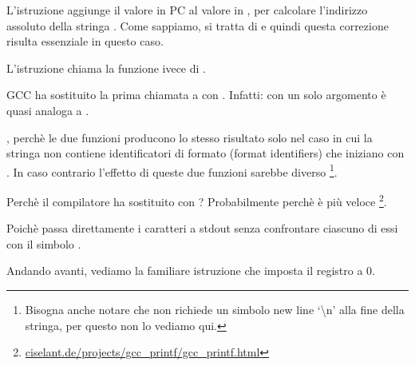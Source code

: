 L'istruzione  aggiunge il valore in \ac{PC} al valore in , per calcolare l'indirizzo assoluto della stringa .
Come sappiamo, si tratta di \q{\PICcode} e quindi questa correzione risulta essenziale in questo caso.

L'istruzione  chiama la funzione \puts ivece di \printf.

\label{puts}

GCC ha sostituito la prima chiamata a \printf con \puts.
Infatti: \printf con un solo argomento è quasi analoga a \puts.

, perchè le due funzioni producono lo stesso risultato solo nel caso in cui la stringa non contiene
identificatori di formato (format identifiers) che iniziano con \IT{\%}.
In caso contrario l'effetto di queste due funzioni sarebbe diverso
\footnote{Bisogna anche notare che \puts non richiede un simbolo new line `\textbackslash{}n' alla fine della stringa,
per questo non lo vediamo qui.}.

Perchè il compilatore ha sostituito \printf con \puts? Probabilmente perchè \puts è più veloce
\footnote{\href{http://go.yurichev.com/17063}{ciselant.de/projects/gcc\_printf/gcc\_printf.html}}.

Poichè passa direttamente i caratteri a \gls{stdout} senza confrontare ciascuno di essi con il simbolo \IT{\%}.

Andando avanti, vediamo la familiare istruzione  che imposta il registro  a 0.
